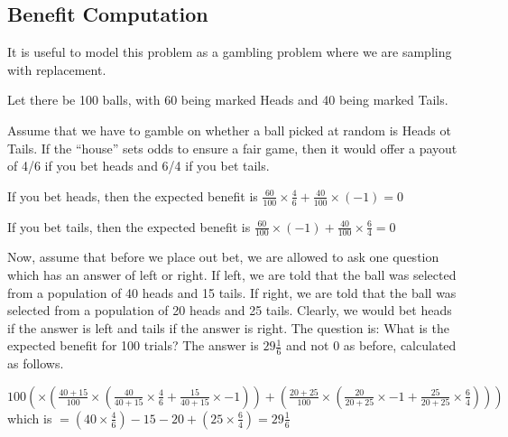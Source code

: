 \subsection{Benefit Computation}
It is useful to model this problem as a gambling problem where we are 
sampling with replacement. 
\bi
\item Let there be 100 balls, with 60  being marked Heads and 40
being marked Tails. 
\item Assume that we have to gamble on whether a ball picked at random is Heads
ot Tails. If the ``house'' sets odds to ensure a fair game, then it would offer
a payout of 4/6 if you bet heads and 6/4 if you bet tails. 
\item If you bet heads, then the expected benefit is 
\(\frac{60}{100} \times \frac{4}{6} + 
\frac{40}{100} \times (-1)  = 0\)
\item If you bet tails, then the expected benefit is 
\(\frac{60}{100} \times (-1) + 
\frac{40}{100} \times \frac{6}{4}  = 0\)
\ei

Now, assume that before we place out bet, we are allowed to ask one question
which has an answer of left or right. If left, we are told that the ball was
selected from a population of 40 heads and 15 tails. If right, we are told that
the ball was selected from a population of 20 heads and 25 tails. Clearly, we
would bet heads if the answer is left and tails if the answer is right. The
question is: What is the expected benefit for 100 trials? 
The answer is \(29 \frac{1}{6}\) and not 0 as before, calculated as follows.

\(100 ( \times ( \frac{40+15}{100} \times ( 
  \frac{40}{40+15} \times \frac{4}{6}  + 
  \frac{15}{40+15} \times -1 ) ) + 
  ( \frac{20+25}{100} \times ( 
  \frac{20}{20+25} \times -1 + 
  \frac{25}{20+25} \times \frac{6}{4}  ) ) )
  \)
which is \(
 = (40 \times  \frac{4}{6}) -15 - 20 + (25 \times \frac{6}{4} )
 = 29 \frac{1}{6}\)


